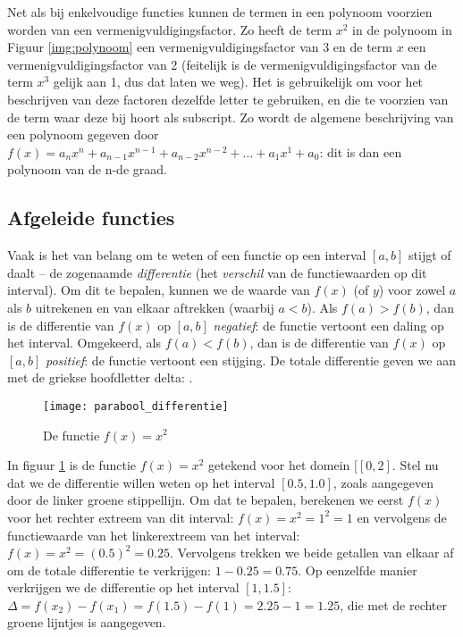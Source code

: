 Net als bij enkelvoudige functies kunnen de termen in een polynoom voorzien worden van een vermenigvuldigingsfactor. Zo heeft de term $x^2$ in de polynoom in Figuur \ref{img:polynoom} een vermenigvuldigingsfactor van 3 en de term $x$ een vermenigvuldigingsfactor van 2 (feitelijk is de vermenigvuldigingsfactor van de term $x^3$ gelijk aan 1, dus dat laten we weg). Het is gebruikelijk om voor het beschrijven van deze factoren dezelfde letter te gebruiken, en die te voorzien van de term waar deze bij hoort als subscript. Zo wordt de algemene beschrijving van een polynoom gegeven door $f(x) = a_nx^n + a_{n-1}x^{n-1} + a_{n-2}x^{n-2}+ \dots + a_1x^1+a_0$: dit is dan een polynoom van de n-de graad.


\subsection{Afgeleide functies}

Vaak is het van belang om te weten of een functie op een interval $\left[a,b\right]$ stijgt of daalt – de zogenaamde \textit{differentie} (het \textit{verschil} van de functiewaarden op dit interval). Om dit te bepalen, kunnen we de waarde van $f(x)$ (of $y$) voor zowel $a$ als $b$ uitrekenen en van elkaar aftrekken (waarbij $a<b$). Als $f(a) > f(b)$, dan is de differentie van $f(x)$ op $\left[a,b\right]$ \textit{negatief}: de functie vertoont een daling op het interval. Omgekeerd, als $f(a) < f(b)$, dan is de differentie van $f(x)$ op $\left[a,b\right]$ \textit{positief}: de functie vertoont een stijging. De totale differentie geven we aan met de griekse hoofdletter delta: \Delta.

\begin{figure}[h]
    \centering
    \texttt{[image: parabool\_differentie]}
    \caption{De functie $f(x) = x^2$\label{img:parabool_differentie}}
\end{figure}

In figuur \ref{img:parabool_differentie} is de functie $f(x)=x^2$ getekend voor het domein $[\left[0,2\right]$. Stel nu dat we de differentie willen weten op het interval $\left[0.5, 1.0\right]$, zoals aangegeven door de linker groene stippellijn. Om dat te bepalen, berekenen we eerst $f(x)$ voor het rechter extreem van dit interval: $f(x) = x^2 = 1^2 = 1$ en vervolgens de functiewaarde van het linkerextreem van het interval: $f(x) = x^2 = (0.5)^2 = 0.25$. Vervolgens trekken we beide getallen van elkaar af om de totale differentie te verkrijgen: $1-0.25=0.75$. Op eenzelfde manier verkrijgen we de differentie op het interval $\left[1, 1.5\right]$: $\Delta = f(x_2) - f(x_1) = f(1.5)-f(1) = 2.25-1 = 1.25$, die met de rechter groene lijntjes is aangegeven. 

